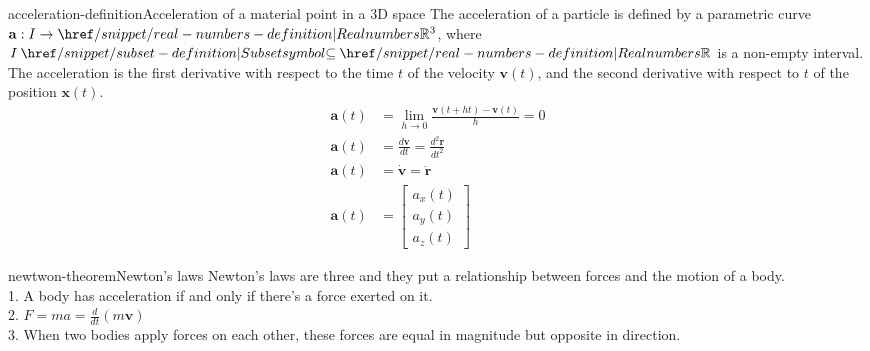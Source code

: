 \documentclass[preview]{standalone}
\begin{document}
\begin{snippetdefinition}{acceleration-definition}{Acceleration of a material point in a 3D space}
    The acceleration of a particle is defined by a parametric curve $\mathbf{a} : I \to \realnumbers^3 $, where $I \subseteq \realnumbers$ is a non-empty interval. \\
    The acceleration is the first derivative with respect to the time $t$ of the velocity $\mathbf{v}(t)$, and the second derivative with respect to $t$ of the position $\mathbf{x}(t)$.
    \begin{align*}
        \mathbf{a}(t) &= \lim_{h \to 0} \frac{\mathbf{v}(t + ht) - \mathbf{v}(t)}{h} = 0 \\
        \mathbf{a}(t) &= \frac{d\mathbf{v}}{dt} = \frac{d^2 \mathbf{r}}{dt^2} \\
        \mathbf{a}(t) &= \dot{\mathbf{v}} = \ddot{\mathbf{r}} \\
        \mathbf{a}(t) &= \begin{bmatrix}
            a_x(t) \\ a_y(t) \\ a_z(t)
        \end{bmatrix}
    \end{align*} 
\end{snippetdefinition}




\begin{snippettheorem}{newtwon-theorem}{Newton's laws}
    Newton's laws are three and they put a relationship between forces and the motion of a body. \\
    1. A body has acceleration if and only if there's a force exerted on it.  \\
    2. $F = ma = \frac{d}{dt}\left(m \mathbf{v} \right)$ \\
    3. When two bodies apply forces on each other, these forces are equal in magnitude but opposite in direction.
\end{snippettheorem}
\end{document}
